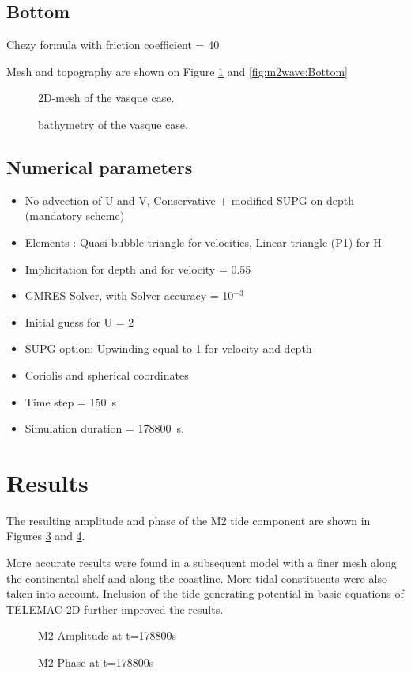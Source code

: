 \subsection{Bottom}
Chezy formula with friction coefficient = 40

Mesh and topography are shown on Figure \ref{fig:m2wave:Mesh} and \ref{fig:m2wave:Bottom}

\begin{figure}[H]
 \centering
  \caption{2D-mesh of the vasque case.}\label{fig:m2wave:Mesh}
\end{figure}
\begin{figure}[H]
 \centering
  \caption{bathymetry of the vasque case.}\label{fig:m2wave:Bathy}
\end{figure}

\subsection{Numerical parameters}
\begin{itemize}
\item No advection of U and V, Conservative + modified SUPG on depth (mandatory scheme)
\item Elements : Quasi-bubble triangle for velocities, Linear triangle (P1) for H
\item Implicitation for depth and for velocity = 0.55
\item GMRES Solver, with  Solver accuracy = 10$^{-3}$
\item  Initial guess for U = 2
\item  SUPG option: Upwinding equal to 1 for velocity and depth
\item Coriolis and spherical coordinates
\item Time step = 150~s
\item Simulation duration = 178800~s.
\end{itemize}

\section{Results}
The resulting amplitude and phase of the M2 tide component are shown in Figures \ref{fig:m2wave:Ampli} and \ref{fig:m2wave:Phase}. 

More accurate results were found in a subsequent model with a finer mesh along the
continental shelf and along the coastline. More tidal constituents were also taken
into account. Inclusion of the tide generating potential in basic equations of TELEMAC-2D
further improved the results.

\begin{figure}[H]
 \centering
  \caption{M2 Amplitude at t=178800s}\label{fig:m2wave:Ampli}
\end{figure}

\begin{figure}[H]
 \centering
  \caption{M2 Phase at t=178800s }\label{fig:m2wave:Phase}
\end{figure}
